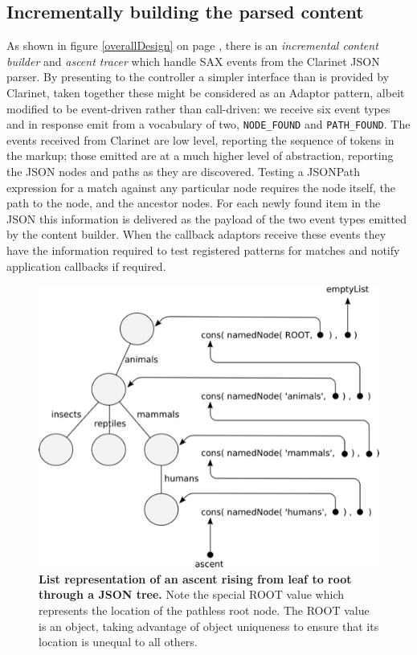 \documentclass[12pt, ]{article}
\makeatletter
\def\maxwidth{\ifdim\Gin@nat@width>\linewidth\linewidth
\else\Gin@nat@width\fi}
\let\Oldincludegraphics\includegraphics
\renewcommand{\includegraphics}[1]{\Oldincludegraphics[width=\maxwidth]{#1}}
\makeatother
\begin{document}
\subsection{Incrementally building the parsed
content}\label{incrementally-building-the-parsed-content}

As shown in figure \ref{overallDesign} on page \pageref{overallDesign},
there is an \emph{incremental content builder} and \emph{ascent tracer}
which handle SAX events from the Clarinet JSON parser. By presenting to
the controller a simpler interface than is provided by Clarinet, taken
together these might be considered as an Adaptor pattern, albeit
modified to be event-driven rather than call-driven: we receive six
event types and in response emit from a vocabulary of two,
\texttt{NODE\_FOUND} and \texttt{PATH\_FOUND}. The events received from
Clarinet are low level, reporting the sequence of tokens in the markup;
those emitted are at a much higher level of abstraction, reporting the
JSON nodes and paths as they are discovered. Testing a JSONPath
expression for a match against any particular node requires the node
itself, the path to the node, and the ancestor nodes. For each newly
found item in the JSON this information is delivered as the payload of
the two event types emitted by the content builder. When the callback
adaptors receive these events they have the information required to test
registered patterns for matches and notify application callbacks if
required.

\begin{figure}[htbp]
\centering
\includegraphics{images/ascent.png}
\caption{\textbf{List representation of an ascent rising from leaf to
root through a JSON tree.} Note the special ROOT value which represents
the location of the pathless root node. The ROOT value is an object,
taking advantage of object uniqueness to ensure that its location is
unequal to all others. \label{ascent}}
\end{figure}
\end{document}

